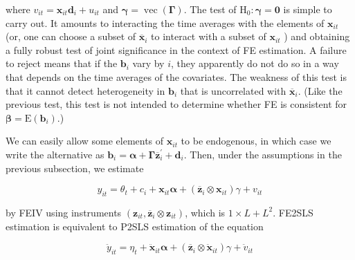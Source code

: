 \documentclass[10pt]{article}
\begin{document}
where $v_{i t}=\mathbf{x}_{i t} \mathbf{d}_{i}+u_{i t}$ and $\boldsymbol{\gamma}=\operatorname{vec}(\boldsymbol{\Gamma})$. The test of $\mathrm{H}_{0}: \boldsymbol{\gamma}=\mathbf{0}$ is simple to carry out. It amounts to interacting the time averages with the elements of $\mathbf{x}_{i t}$ (or, one can choose a subset of $\overline{\mathbf{x}}_{i}$ to interact with a subset of $\mathbf{x}_{i t}$ ) and obtaining a fully robust test of joint significance in the context of FE estimation. A failure to reject means that if the $\mathbf{b}_{i}$ vary by $i$, they apparently do not do so in a way that depends on the time averages of the covariates. The weakness of this test is that it cannot detect heterogeneity in $\mathbf{b}_{i}$ that is uncorrelated with $\overline{\mathbf{x}}_{i}$. (Like the previous test, this test is not intended to determine whether FE is consistent for $\boldsymbol{\beta}=\mathrm{E}\left(\mathbf{b}_{i}\right)$.)

We can easily allow some elements of $\mathbf{x}_{i t}$ to be endogenous, in which case we write the alternative as $\mathbf{b}_{i}=\boldsymbol{\alpha}+\boldsymbol{\Gamma} \overline{\mathbf{z}}_{i}^{\prime}+\mathbf{d}_{i}$. Then, under the assumptions in the previous subsection, we estimate


\begin{equation*}
y_{i t}=\theta_{t}+c_{i}+\mathbf{x}_{i t} \boldsymbol{\alpha}+\left(\overline{\mathbf{z}}_{i} \otimes \mathbf{x}_{i t}\right) \gamma+v_{i t} \tag{11.97}
\end{equation*}


by FEIV using instruments $\left(\mathbf{z}_{i t}, \overline{\mathbf{z}}_{i} \otimes \mathbf{z}_{i t}\right)$, which is $1 \times L+L^{2}$. FE2SLS estimation is equivalent to P2SLS estimation of the equation


\begin{equation*}
\ddot{y}_{i t}=\eta_{t}+\ddot{\mathbf{x}}_{i t} \boldsymbol{\alpha}+\left(\overline{\mathbf{z}}_{i} \otimes \ddot{\mathbf{x}}_{i t}\right) \gamma+\ddot{v}_{i t} \tag{11.98}
\end{equation*}
\end{document}
